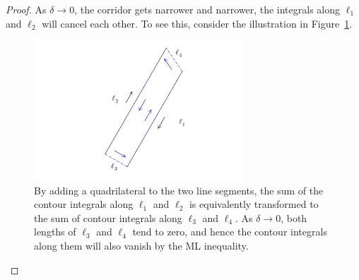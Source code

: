 \documentclass[thmcnt=section, color=cyan, 12pt]{my-elegantbook}
\begin{document}
\begin{proof}
    As $\delta \to 0$,
    the corridor gets narrower and narrower,
    the integrals along $\ell_1$ and $\ell_2$
    will cancel each other.
    To see this, consider the illustration in Figure~\ref{fig:3}.

    \begin{figure}[H]
        \centering
        \includegraphics[width=0.7\textwidth]{figures/adding-a-quadrilateral-to-two-line-segments.png}
        \caption{By adding a quadrilateral to the two line segments, the sum of the contour integrals along $\ell_1$ and $\ell_2$ is equivalently transformed to the sum of contour integrals along $\ell_3$ and $\ell_4$. As $\delta \to 0$, both lengths of $\ell_3$ and $\ell_4$ tend to zero, and hence the contour integrals along them will also vanish
            by the ML inequality.}
        \label{fig:3}
    \end{figure}


\end{proof}
\end{document}
